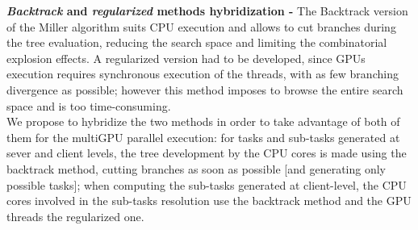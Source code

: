 \textbf{\emph{Backtrack} and \emph{regularized} methods hybridization -} 
The Backtrack version of the Miller algorithm suits CPU execution and allows to cut branches during the tree evaluation, reducing the search space and limiting the combinatorial explosion effects. A regularized version had to be developed, since GPUs execution requires synchronous execution of the threads, with as few branching divergence as possible; however this method imposes to browse the entire search space and is too time-consuming. \\
We propose to hybridize the two methods in order to take advantage of both of them for the multiGPU parallel execution: 
for tasks and sub-tasks generated at sever and client levels, the tree development by the CPU cores is made using the backtrack method, cutting branches as soon as possible [and generating only possible tasks]; when computing the sub-tasks generated at client-level, the CPU cores involved in the sub-tasks resolution use the backtrack method and the GPU threads the regularized one. 




